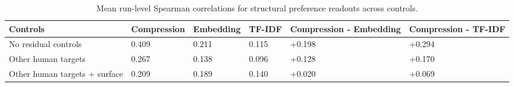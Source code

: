 \begin{table}
\caption{Mean run-level Spearman correlations for structural preference readouts across controls.}
\label{tab:table_1_readout_convergence}
\begin{tabular}{llllll}
\toprule
Controls & Compression & Embedding & TF-IDF & Compression - Embedding & Compression - TF-IDF \\
\midrule
No residual controls & 0.409 & 0.211 & 0.115 & +0.198 & +0.294 \\
Other human targets & 0.267 & 0.138 & 0.096 & +0.128 & +0.170 \\
Other human targets + surface & 0.209 & 0.189 & 0.140 & +0.020 & +0.069 \\
\bottomrule
\end{tabular}
\end{table}
